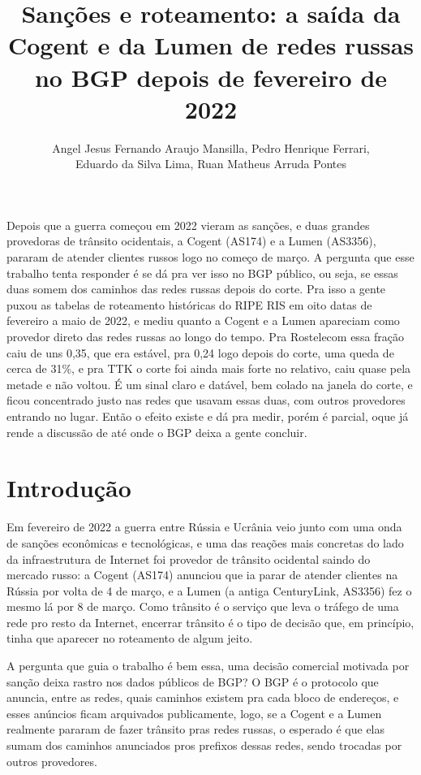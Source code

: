 \documentclass[12pt]{article}
\title{Sanções e roteamento: a saída da Cogent e da Lumen de redes russas no BGP depois de fevereiro de 2022}
\author{Angel Jesus Fernando Araujo Mansilla\inst{1}, Pedro Henrique Ferrari\inst{1}, \\ Eduardo da Silva Lima\inst{1}, Ruan Matheus Arruda Pontes\inst{1}}
\begin{document}
\maketitle

\begin{resumo}
Depois que a guerra começou em 2022 vieram as sanções, e duas grandes provedoras de trânsito ocidentais, a Cogent (AS174) e a Lumen (AS3356), pararam de atender clientes russos logo no começo de março. A pergunta que esse trabalho tenta responder é se dá pra ver isso no BGP público, ou seja, se essas duas somem dos caminhos das redes russas depois do corte. Pra isso a gente puxou as tabelas de roteamento históricas do RIPE RIS em oito datas de fevereiro a maio de 2022, e mediu quanto a Cogent e a Lumen apareciam como provedor direto das redes russas ao longo do tempo. Pra Rostelecom essa fração caiu de uns 0,35, que era estável, pra 0,24 logo depois do corte, uma queda de cerca de 31\%, e pra TTK o corte foi ainda mais forte no relativo, caiu quase pela metade e não voltou. É um sinal claro e datável, bem colado na janela do corte, e ficou concentrado justo nas redes que usavam essas duas, com outros provedores entrando no lugar. Então o efeito existe e dá pra medir, porém é parcial, oque já rende a discussão de até onde o BGP deixa a gente concluir.
\end{resumo}

\section{Introdução}

Em fevereiro de 2022 a guerra entre Rússia e Ucrânia veio junto com uma onda de sanções econômicas e tecnológicas, e uma das reações mais concretas do lado da infraestrutura de Internet foi provedor de trânsito ocidental saindo do mercado russo: a Cogent (AS174) anunciou que ia parar de atender clientes na Rússia por volta de 4 de março, e a Lumen (a antiga CenturyLink, AS3356) fez o mesmo lá por 8 de março. Como trânsito é o serviço que leva o tráfego de uma rede pro resto da Internet, encerrar trânsito é o tipo de decisão que, em princípio, tinha que aparecer no roteamento de algum jeito.

A pergunta que guia o trabalho é bem essa, uma decisão comercial motivada por sanção deixa rastro nos dados públicos de BGP? O BGP é o protocolo que anuncia, entre as redes, quais caminhos existem pra cada bloco de endereços, e esses anúncios ficam arquivados publicamente, logo, se a Cogent e a Lumen realmente pararam de fazer trânsito pras redes russas, o esperado é que elas sumam dos caminhos anunciados pros prefixos dessas redes, sendo trocadas por outros provedores.
\end{document}
